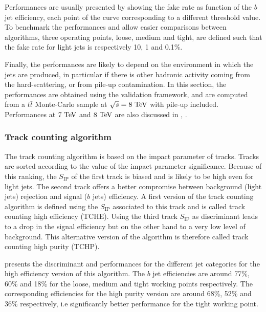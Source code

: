     Performances are usually presented by showing the fake rate as function of
    the $b$ jet efficiency, each point of the curve corresponding to a different
    threshold value. To benchmark the performances and allow easier comparisons
    between algorithms, three operating points, loose, medium and tight, are
    defined such that the fake rate for light jets is respectively 10, 1 and
    0.1\%.

    Finally, the performances are likely to depend on the environment in which
    the jets are produced, in particular if there is other hadronic activity
    coming from the hard-scattering, or from pile-up contamination. In this
    section, the performances are obtained using the validation framework, and
    are computed from a $t\bar{t}$ Monte-Carlo sample at $\sqrt{s} = 8~\text{TeV}$ with
    pile-up included. Performances at $7~\text{TeV}$ and $8~\text{TeV}$ are also discussed in
    \cite{BTagging7TeV}, \cite{BTagging8TeV}.

        \subsubsection{Track counting algorithm}

    The track counting algorithm is based on the impact parameter of tracks.
    Tracks are sorted according to the value of the impact parameter
    significance. Because of this ranking, the $S_\text{IP}$ of the first track
    is biased and is likely to be high even for light jets. The second track
    offers a better compromise between background (light jets) rejection and
    signal ($b$ jets) efficiency. A first version of the track counting
    algorithm is defined using the $S_\text{IP}$ associated to this track and is
    called track counting high efficiency (TCHE). Using the third track
    $S_\text{IP}$ as discriminant leads to a drop in the signal efficiency but
    on the other hand to a very low level of background. This alternative
    version of the algorithm is therefore called track counting high purity
    (TCHP).

     presents the discriminant and performances for
    the different jet categories for the high efficiency version of this
    algorithm. The $b$ jet efficiencies are around 77\%, 60\% and 18\% for the
    loose, medium and tight working points respectively. The corresponding
    efficiencies for the high purity version are around 68\%, 52\% and 36\%
    respectively, i.e significantly better performance for the tight working
    point.

